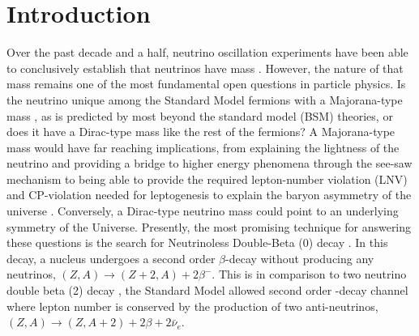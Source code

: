 \section{Introduction}

Over the past decade and a half, neutrino oscillation experiments have
been able to conclusively establish that neutrinos have mass
\cite{SNO2001,SNO2002,SuperK2002,kamland2003}. However, the nature of
that mass remains one of the most fundamental open questions in
particle physics. Is the neutrino unique among the Standard Model
fermions with a Majorana-type mass \cite{Majorana1937}, as is
predicted by most beyond the standard model (BSM) theories, or does it
have a Dirac-type mass like the rest of the fermions? A Majorana-type
mass would have far reaching implications, from explaining the
lightness of the neutrino and providing a bridge to higher energy
phenomena through the see-saw mechanism
\cite{GellMann1980,Yanagida1979} to being able to provide the required
lepton-number violation (LNV) and {\sf CP}-violation needed for
leptogenesis to explain the baryon asymmetry of the universe
\cite{Fukugita1986,Luty1992}. Conversely, a Dirac-type neutrino mass
could point to an underlying symmetry of the Universe.  Presently, the
most promising technique for answering these questions is the search
for Neutrinoless Double-Beta (0\nbb) decay \cite{Furry1939}. In this
decay, a nucleus undergoes a second order $\beta$-decay without
producing any neutrinos, $(Z,A)\rightarrow(Z+2,A)+2\beta^-$.  This is in comparison to two neutrino double beta (2{\nbb}) decay
\cite{GoeppertMayer1935}, the Standard Model allowed second order
\bmd-decay channel where lepton number is conserved by the
production of two anti-neutrinos, \mbox{$(Z,A)\rightarrow(Z,A+2)+2\beta+2\bar\nu_e$}.


